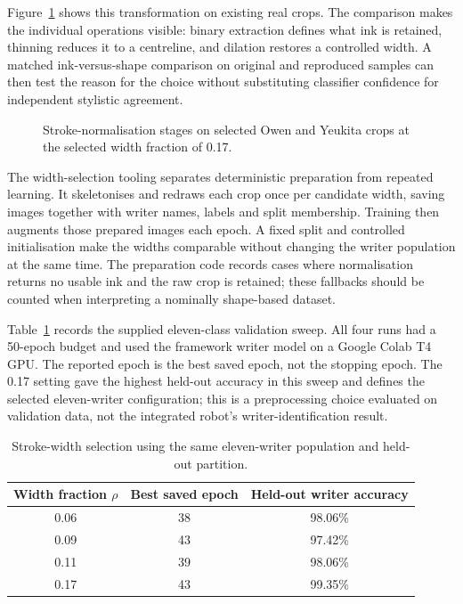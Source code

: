 Figure~\ref{fig:des-strokenorm} shows this transformation on existing real crops. The comparison makes the individual operations visible: binary extraction defines what ink is retained, thinning reduces it to a centreline, and dilation restores a controlled width. A matched ink-versus-shape comparison on original and reproduced samples can then test the reason for the choice without substituting classifier confidence for independent stylistic agreement.


\begin{figure}[!htbp]\centering
{}
\caption{Stroke-normalisation stages on selected Owen and Yeukita crops at the selected width fraction of 0.17.}
\label{fig:des-strokenorm}
\end{figure}


The width-selection tooling separates deterministic preparation from repeated learning. It skeletonises and redraws each crop once per candidate width, saving images together with writer names, labels and split membership. Training then augments those prepared images each epoch. A fixed split and controlled initialisation make the widths comparable without changing the writer population at the same time. The preparation code records cases where normalisation returns no usable ink and the raw crop is retained; these fallbacks should be counted when interpreting a nominally shape-based dataset.

Table~\ref{tab:des-widthselection} records the supplied eleven-class validation sweep. All four runs had a 50-epoch budget and used the framework writer model on a Google Colab T4 GPU. The reported epoch is the best saved epoch, not the stopping epoch. The 0.17 setting gave the highest held-out accuracy in this sweep and defines the selected eleven-writer configuration; this is a preprocessing choice evaluated on validation data, not the integrated robot's writer-identification result.


\begin{table}[!htbp]\centering\small
\begin{tabular}{|c|c|c|}
\hline\textbf{Width fraction $\rho$}&\textbf{Best saved epoch}&\textbf{Held-out writer accuracy}\\\hline
0.06&38&98.06\%\\\hline
0.09&43&97.42\%\\\hline
0.11&39&98.06\%\\\hline
0.17&43&99.35\%\\\hline
\end{tabular}
\caption{Stroke-width selection using the same eleven-writer population and held-out partition.}
\label{tab:des-widthselection}
\end{table}

